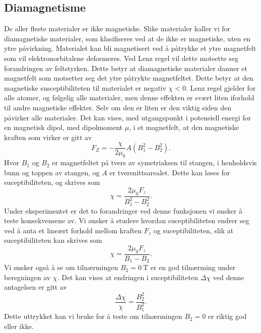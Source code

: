 \documentclass[%
 reprint,
 amsmath,amssymb,
 aps,
]{revtex4-1}
\begin{document}
\subsection{Diamagnetisme}
De aller fleste materialer er ikke magnetiske. Slike materialer kaller vi for diamagnetiske materialer, som klasifiseres ved at de ikke er magnetiske, uten en ytre påvirkning. Materialet kan bli magnetisert ved å påtrykke et ytre magnetfelt som vil elektronorbitalene deformeres. Ved Lenz regel vil dette motsette seg forandringen av feltstyrken. Dette betyr at diamagnetiske materialer danner et magnetfelt som motsetter seg det ytre påtrykte magnetfeltet. Dette betyr at den magnetiske susceptibiliteten til materialet er negativ $\chi < 0$. Lenz regel gjelder for alle atomer, og følgelig alle materialer, men denne effekten er svært liten iforhold til andre magnetiske effekter. Selv om den er liten er den viktig siden den påvirker alle materialer. Det kan vises, med utgangspunkt i potensiell energi for en magnetisk dipol, med dipolmoment $\mu$, i et magnetfelt, at den magnetiske kraften som virker er gitt av
\begin{equation}
  F_Z = -\frac{\chi}{2\mu_0}A\left(B_1^2 - B_2^2\right). \label{vismut}
\end{equation}
Hvor $B_1$ og $B_2$ er magnetfeltet på tvers av symetriaksen til stangen, i henholdsvis bunn og toppen av stangen, og $A$ er tversnittsarealet. Dette kan løses for suceptibiliteten, og skrives som
\begin{equation}
  \chi = \frac{2\mu_0F_z}{B_1^2 - B_2^2}.
\end{equation}
Under eksperimentet er det to forandringer ved denne funksjonen vi ønsker å teste konsekvensene av. Vi ønsker å studere hvordan suceptibiliteten endrer seg ved å anta et lineært forhold mellom kraften $F_z$ og suceptibiliteten, slik at suceptibiliteten kan skrives som
\begin{equation}
  \chi = \frac{2\mu_0F_z}{B_1 - B_2}.\label{lin_chi}
\end{equation}
Vi ønsker også å se om tilnærmingen $B_2=\SI{0}{\tesla}$ er en god tilnærming under beregningen av $\chi$. Det kan vises at endringen i suceptibiliteten $\Delta \chi$ ved denne antagelsen er gitt av
\begin{equation}
  \frac{\Delta \chi}{\chi} = \frac{B_2^2}{B_1^2}. \label{test_chi}
\end{equation}
Dette uttrykket kan vi bruke for å teste om tilnærmingen $B_2=0$ er riktig god eller ikke.
\end{document}
